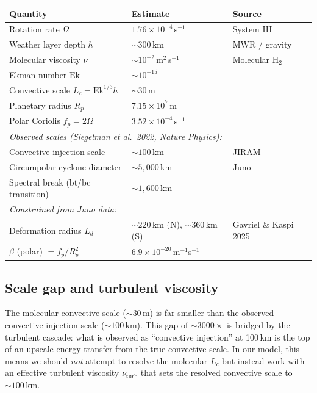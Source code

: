\documentclass[11pt]{article}
\newcommand{\Ek}{\mathrm{Ek}}
\newcommand{\Ld}{L_d}
\newcommand{\Lc}{L_c}
\begin{document}
\begin{center}
\begin{tabular}{lll}
\toprule
Quantity & Estimate & Source \\
\midrule
Rotation rate $\Omega$ & $1.76 \times 10^{-4}$\,s$^{-1}$ & System III \\
Weather layer depth $h$ & $\sim 300$\,km & MWR / gravity \\
Molecular viscosity $\nu$ & $\sim 10^{-2}$\,m$^2$\,s$^{-1}$ & Molecular H$_2$ \\
Ekman number $\Ek$ & $\sim 10^{-15}$ & \\
Convective scale $\Lc = \Ek^{1/3}h$ & $\sim 30$\,m & \\
Planetary radius $R_p$ & $7.15\times 10^7$\,m & \\
Polar Coriolis $f_p = 2\Omega$ & $3.52\times 10^{-4}$\,s$^{-1}$ & \\
\midrule
\multicolumn{3}{l}{\emph{Observed scales (Siegelman et al.\ 2022, Nature Physics):}} \\
Convective injection scale & $\sim 100$\,km & JIRAM \\
Circumpolar cyclone diameter & $\sim 5{,}000$\,km & Juno \\
Spectral break (bt/bc transition) & $\sim 1{,}600$\,km & \\
\midrule
\multicolumn{3}{l}{\emph{Constrained from Juno data:}} \\
Deformation radius $\Ld$ & $\sim 220$\,km (N), $\sim 360$\,km (S) & Gavriel \& Kaspi 2025 \\
$\beta$ (polar) $= f_p/R_p^2$ & $6.9 \times 10^{-20}$\,m$^{-1}$s$^{-1}$ & \\
\bottomrule
\end{tabular}
\end{center}

\subsection{Scale gap and turbulent viscosity}

The molecular convective scale ($\sim 30$\,m) is far smaller than the observed convective injection scale ($\sim 100$\,km). This gap of $\sim 3000\times$ is bridged by the turbulent cascade: what is observed as ``convective injection'' at 100\,km is the top of an upscale energy transfer from the true convective scale. In our model, this means we should \emph{not} attempt to resolve the molecular $\Lc$ but instead work with an effective turbulent viscosity $\nu_{\mathrm{turb}}$ that sets the resolved convective scale to $\sim 100$\,km.
\end{document}
